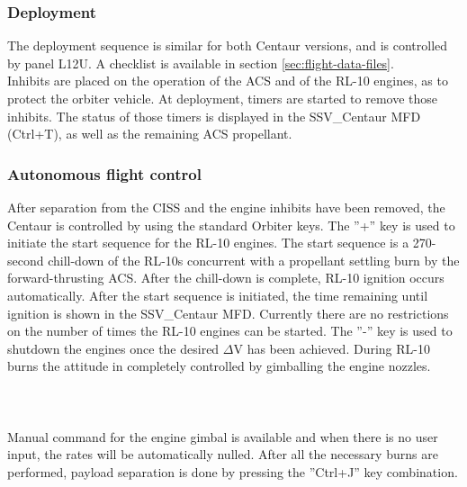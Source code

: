 \documentclass[Space_Shuttle_Vessel_Manual.tex]{subfiles}
\begin{document}
\begin{multicols*}{2}
\subsubsection{Deployment}
The deployment sequence is similar for both Centaur versions, and is controlled by panel L12U. A checklist is available in section \ref{sec:flight-data-files}.
\\
Inhibits are placed on the operation of the ACS and of the RL-10 engines, as to protect the orbiter vehicle. At deployment, timers are started to remove those inhibits. The status of those timers is displayed in the SSV\_Centaur MFD (Ctrl+T), as well as the remaining ACS propellant.

\subsubsection{Autonomous flight control}
After separation from the CISS and the engine inhibits have been removed, the Centaur is controlled by using the standard Orbiter keys. The ''+'' key is used to initiate the start sequence for the RL-10 engines. The start sequence is a 270-second chill-down of the RL-10s concurrent with a propellant settling burn by the forward-thrusting ACS. After the chill-down is complete, RL-10 ignition occurs automatically. After the start sequence is initiated, the time remaining until ignition is shown in the SSV\_Centaur MFD. Currently there are no restrictions on the number of times the RL-10 engines can be started. The ''-'' key is used to shutdown the engines once the desired $\Delta$V has been achieved. During RL-10 burns the attitude in completely controlled by gimballing the engine nozzles.
\\
\\
\\
\\
Manual command for the engine gimbal is available and when there is no user input, the rates will be automatically nulled. After all the necessary burns are performed, payload separation is done by pressing the ''Ctrl+J'' key combination.


\end{multicols*}
\end{document}

